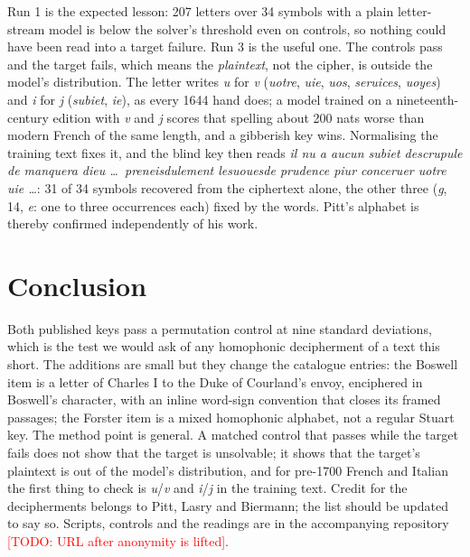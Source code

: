 \documentclass[11pt]{article}
\newcommand{\todo}[1]{\textcolor{red}{[TODO: #1]}}
\begin{document}
Run 1 is the expected lesson: 207 letters over 34 symbols with a plain letter-stream model is below the solver's threshold even on controls, so nothing could have been read into a target failure. Run 3 is the useful one. The controls pass and the target fails, which means the \emph{plaintext}, not the cipher, is outside the model's distribution. The letter writes \emph{u} for \emph{v} (\emph{uotre}, \emph{uie}, \emph{uos}, \emph{seruices}, \emph{uoyes}) and \emph{i} for \emph{j} (\emph{subiet}, \emph{ie}), as every 1644 hand does; a model trained on a nineteenth-century edition with \emph{v} and \emph{j} scores that spelling about 200 nats worse than modern French of the same length, and a gibberish key wins. Normalising the training text fixes it, and the blind key then reads \emph{il nu a aucun subiet descrupule de manquera dieu \ldots\ preneisdulement lesuouesde prudence piur conceruer uotre uie \ldots}: 31 of 34 symbols recovered from the ciphertext alone, the other three (\emph{g}, 14, \emph{e}: one to three occurrences each) fixed by the words. Pitt's alphabet is thereby confirmed independently of his work.

\section{Conclusion}

Both published keys pass a permutation control at nine standard deviations, which is the test we would ask of any homophonic decipherment of a text this short. The additions are small but they change the catalogue entries: the Boswell item is a letter of Charles I to the Duke of Courland's envoy, enciphered in Boswell's character, with an inline word-sign convention that closes its framed passages; the Forster item is a mixed homophonic alphabet, not a regular Stuart key. The method point is general. A matched control that passes while the target fails does not show that the target is unsolvable; it shows that the target's plaintext is out of the model's distribution, and for pre-1700 French and Italian the first thing to check is \emph{u}/\emph{v} and \emph{i}/\emph{j} in the training text. Credit for the decipherments belongs to Pitt, Lasry and Biermann; the list should be updated to say so. Scripts, controls and the readings are in the accompanying repository \todo{URL after anonymity is lifted}.



\end{document}
